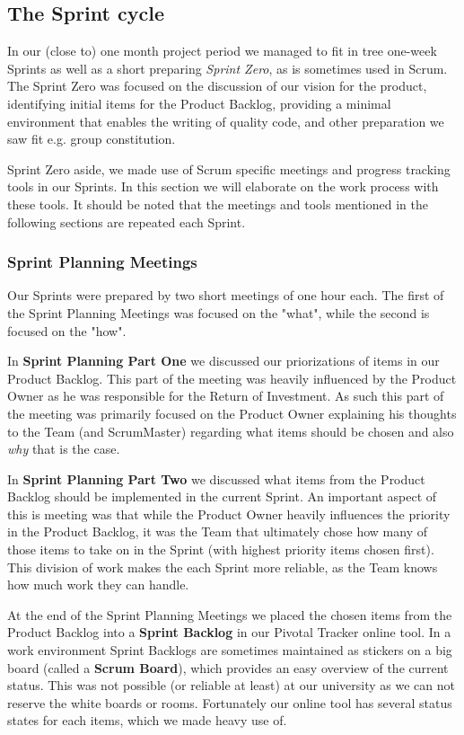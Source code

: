 \subsection{The Sprint cycle}

In our (close to) one month project period we managed to fit in tree one-week Sprints as well as a short preparing \textit{Sprint Zero}, as is sometimes used in Scrum. The Sprint Zero was focused on the discussion of our vision for the product, identifying initial items for the Product Backlog, providing a minimal environment that enables the  writing of quality code, and other preparation we saw fit e.g. group constitution.

Sprint Zero aside, we made use of Scrum specific meetings and progress tracking tools in our Sprints. In this section we will elaborate on the work process with these tools. It should be noted that the meetings and tools mentioned in the following sections are repeated each Sprint.


\subsubsection{Sprint Planning Meetings} 
Our Sprints were prepared by two short meetings of one hour each. The first of the Sprint Planning Meetings was focused on the "what", while the second is focused on the "how".

In \textbf{Sprint Planning Part One}  we discussed our priorizations of items in our Product Backlog. This part of the meeting was heavily influenced by the Product Owner as he was responsible for the Return of Investment. As such this part of the meeting was primarily focused on the Product Owner explaining his thoughts to the Team (and ScrumMaster) regarding what items should be chosen and also \textit{why} that is the case.

In \textbf{Sprint Planning Part Two} we discussed what items from the Product Backlog should be implemented in the current Sprint. An important aspect of this is meeting was that while the Product Owner heavily influences the priority in the Product Backlog, it was the Team that ultimately chose how many of those items to take on in the Sprint (with highest priority items chosen first). This division of work makes the each Sprint more reliable, as the Team knows how much work they can handle.

At the end of the Sprint Planning Meetings we placed the chosen items from the Product Backlog into a \textbf{Sprint Backlog} in our Pivotal Tracker online tool. In a work environment Sprint Backlogs are sometimes maintained as stickers on a big board (called a \textbf{Scrum Board}), which provides an easy overview of the current status. This was not possible (or reliable at least) at our university as we can not reserve the white boards or rooms. Fortunately our online tool has several status states for each items, which we made heavy use of.

